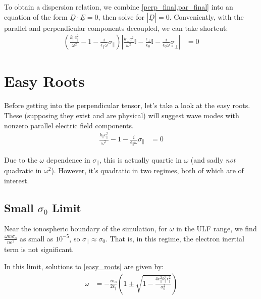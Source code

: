 \documentclass{article}
\begin{document}
To obtain a dispersion relation, we combine \cref{perp_final,par_final} into 
an equation of the form $\underline{\underline{D}} \cdot \underline{E} = 0$, 
then solve for $| \underline{\underline{D}} | = 0$. Conveniently, with the 
parallel and perpendicular components decoupled, we can take shortcut: 
\begin{align}
  \left( \frac{k_\parallel c_\parallel^2}{\omega^2} - 1 - 
    \frac{i}{\epsilon_\parallel \omega} \sigma_\parallel \right)
    \left| \frac{k_\bot c^2}{\omega^2} \mathbb{I} - 
    \frac{\epsilon_\bot}{\epsilon_0} \mathbb{I} - 
    \frac{i}{\epsilon_0 \omega} \underline{\underline{\sigma}}_\bot \right| 
      &= 0
\end{align}

\section{Easy Roots}

Before getting into the perpendicular tensor, let's take a look at the easy 
roots. These (supposing they exist and are physical) will suggest wave modes 
with nonzero parallel electric field components. 
\begin{align}
  \label{easy_roots}
  \frac{k_\parallel c_\parallel^2}{\omega^2} - 1 - 
    \frac{i}{\epsilon_\parallel \omega} \sigma_\parallel &= 0
\end{align}

Due to the $\omega$ dependence in $\sigma_\parallel$, this is actually quartic 
in $\omega$ (and sadly \emph{not} quadratic in $\omega^2$). However, it's 
quadratic in two regimes, both of which are of interest. 

\subsection{Small $\sigma_0$ Limit}

Near the ionospheric boundary of the simulation, for $\omega$ in the ULF 
range, we find $\frac{\omega m \sigma_0}{n e^2}$ as small as $10^{-5}$, so 
$\sigma_\parallel \approx \sigma_0$. That is, in this regime, the electron 
inertial term is not significant. 

In this limit, solutions to \cref{easy_roots} are given by:
\begin{align}
  \omega &= - \frac{i \sigma_0}{2 \epsilon_\parallel} \left( 1 \pm 
    \sqrt{ 1 - 
      \frac{4 c_\parallel^2 k_\parallel^2 \epsilon_\parallel^2}{\sigma_0^2}
    } \right)
\end{align}
\end{document}
